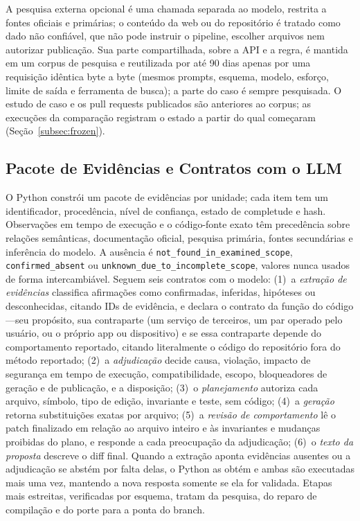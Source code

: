 \documentclass[conference]{IEEEtran}
\begin{document}
A pesquisa externa opcional é uma chamada separada ao modelo, restrita a fontes
oficiais e primárias; o conteúdo da web ou do repositório é tratado como dado
não confiável, que não pode instruir o pipeline, escolher arquivos nem
autorizar publicação. Sua parte compartilhada, sobre a API e a regra, é mantida
em um corpus de pesquisa e reutilizada por até 90 dias apenas por uma
requisição idêntica byte a byte (mesmos prompts, esquema, modelo, esforço,
limite de saída e ferramenta de busca); a parte do caso é sempre pesquisada. O
estudo de caso e os pull requests publicados são anteriores ao corpus; as
execuções da comparação registram o estado a partir do qual começaram
(Seção~\ref{subsec:frozen}).

\subsection{Pacote de Evidências e Contratos com o LLM}

O Python constrói um pacote de evidências por unidade; cada item tem um
identificador, procedência, nível de confiança, estado de completude e hash.
Observações em tempo de execução e o código-fonte exato têm precedência sobre
relações semânticas, documentação oficial, pesquisa primária, fontes
secundárias e inferência do modelo. A ausência é
\texttt{not\_found\_in\_examined\_scope}, \texttt{confirmed\_absent} ou
\texttt{unknown\_due\_to\_}\allowbreak\texttt{incomplete\_scope}, valores nunca
usados de forma intercambiável. Seguem seis contratos com o modelo:
(1)~a \emph{extração de evidências} classifica afirmações como confirmadas,
inferidas, hipóteses ou desconhecidas, citando IDs de evidência, e declara o
contrato da função do código---seu propósito, sua contraparte (um serviço de
terceiros, um par operado pelo usuário, ou o próprio app ou dispositivo) e se
essa contraparte depende do comportamento reportado, citando literalmente o
código do repositório fora do método reportado; (2)~a \emph{adjudicação} decide
causa, violação, impacto de segurança em tempo de execução, compatibilidade,
escopo, bloqueadores de geração e de publicação, e a disposição;
(3)~o \emph{planejamento} autoriza cada arquivo, símbolo, tipo de edição,
invariante e teste, sem código; (4)~a \emph{geração} retorna substituições
exatas por arquivo; (5)~a \emph{revisão de comportamento} lê o patch finalizado
em relação ao arquivo inteiro e às invariantes e mudanças proibidas do plano, e
responde a cada preocupação da adjudicação; (6)~o \emph{texto da proposta}
descreve o diff final. Quando a extração aponta evidências ausentes ou a
adjudicação se abstém por falta delas, o Python as obtém e ambas são executadas
mais uma vez, mantendo a nova resposta somente se ela for validada. Etapas mais
estreitas, verificadas por esquema, tratam da pesquisa, do reparo de compilação
e do porte para a ponta do branch.
\end{document}
